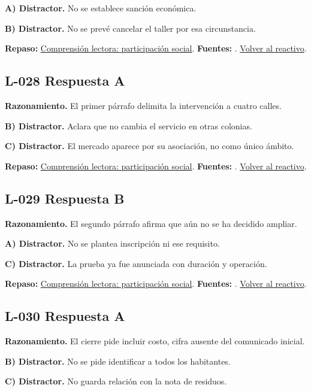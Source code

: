 \textbf{A) Distractor. }No se establece sanción económica.

\textbf{B) Distractor. }No se prevé cancelar el taller por esa circunstancia.

\textbf{Repaso:} \hyperref[sec:l3]{Comprensión lectora: participación social}. \textbf{Fuentes:} \cite{ceneval,reading}. \hyperref[q:L-027]{Volver al reactivo}.\par\medskip

\subsection*{L-028 \quad Respuesta A}\label{s:L-028}
\textbf{Razonamiento.} El primer párrafo delimita la intervención a cuatro calles.

\textbf{B) Distractor. }Aclara que no cambia el servicio en otras colonias.

\textbf{C) Distractor. }El mercado aparece por su asociación, no como único ámbito.

\textbf{Repaso:} \hyperref[sec:l3]{Comprensión lectora: participación social}. \textbf{Fuentes:} \cite{ceneval,reading}. \hyperref[q:L-028]{Volver al reactivo}.\par\medskip

\subsection*{L-029 \quad Respuesta B}\label{s:L-029}
\textbf{Razonamiento.} El segundo párrafo afirma que aún no se ha decidido ampliar.

\textbf{A) Distractor. }No se plantea inscripción ni ese requisito.

\textbf{C) Distractor. }La prueba ya fue anunciada con duración y operación.

\textbf{Repaso:} \hyperref[sec:l3]{Comprensión lectora: participación social}. \textbf{Fuentes:} \cite{ceneval,reading}. \hyperref[q:L-029]{Volver al reactivo}.\par\medskip

\subsection*{L-030 \quad Respuesta A}\label{s:L-030}
\textbf{Razonamiento.} El cierre pide incluir costo, cifra ausente del comunicado inicial.

\textbf{B) Distractor. }No se pide identificar a todos los habitantes.

\textbf{C) Distractor. }No guarda relación con la nota de residuos.

